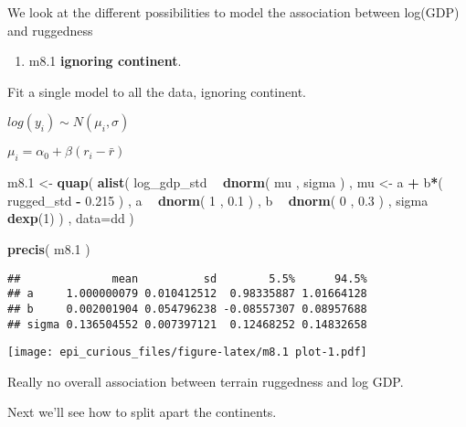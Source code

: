 \documentclass[
]{article}
\newenvironment{Shaded}{\begin{snugshade}}{\end{snugshade}}
\newcommand{\DataTypeTok}[1]{\textcolor[rgb]{0.13,0.29,0.53}{#1}}
\newcommand{\DecValTok}[1]{\textcolor[rgb]{0.00,0.00,0.81}{#1}}
\newcommand{\FloatTok}[1]{\textcolor[rgb]{0.00,0.00,0.81}{#1}}
\newcommand{\KeywordTok}[1]{\textcolor[rgb]{0.13,0.29,0.53}{\textbf{#1}}}
\newcommand{\NormalTok}[1]{#1}
\newcommand{\OperatorTok}[1]{\textcolor[rgb]{0.81,0.36,0.00}{\textbf{#1}}}
\newcommand{\StringTok}[1]{\textcolor[rgb]{0.31,0.60,0.02}{#1}}
\providecommand{\tightlist}{%
  \setlength{\itemsep}{0pt}\setlength{\parskip}{0pt}}
\begin{document}
We look at the different possibilities to model the association between
log(GDP) and ruggedness

\begin{enumerate}
\def\labelenumi{\arabic{enumi}.}
\tightlist
\item
  m8.1 \textbf{ignoring continent}.
\end{enumerate}

Fit a single model to all the data, ignoring continent.

\(log(y_i) \sim N(\mu_i, \sigma)\)

\(\mu_i = \alpha_0 + \beta (r_i - \bar{r})\)

\begin{Shaded}
\begin{Highlighting}[]
\NormalTok{m8}\FloatTok{.1}\NormalTok{ <-}\StringTok{ }\KeywordTok{quap}\NormalTok{(}
    \KeywordTok{alist}\NormalTok{(}
\NormalTok{        log_gdp_std }\OperatorTok{~}\StringTok{ }\KeywordTok{dnorm}\NormalTok{( mu , sigma ) ,}
\NormalTok{        mu <-}\StringTok{ }\NormalTok{a }\OperatorTok{+}\StringTok{ }\NormalTok{b}\OperatorTok{*}\NormalTok{( rugged_std }\OperatorTok{-}\StringTok{ }\FloatTok{0.215}\NormalTok{ ) ,}
\NormalTok{        a }\OperatorTok{~}\StringTok{ }\KeywordTok{dnorm}\NormalTok{( }\DecValTok{1}\NormalTok{ , }\FloatTok{0.1}\NormalTok{ ) ,}
\NormalTok{        b }\OperatorTok{~}\StringTok{ }\KeywordTok{dnorm}\NormalTok{( }\DecValTok{0}\NormalTok{ , }\FloatTok{0.3}\NormalTok{ ) ,}
\NormalTok{        sigma }\OperatorTok{~}\StringTok{ }\KeywordTok{dexp}\NormalTok{(}\DecValTok{1}\NormalTok{)}
\NormalTok{    ) , }\DataTypeTok{data=}\NormalTok{dd )}

 \KeywordTok{precis}\NormalTok{( m8}\FloatTok{.1}\NormalTok{ )}
\end{Highlighting}
\end{Shaded}

\begin{verbatim}
##              mean          sd        5.5%      94.5%
## a     1.000000079 0.010412512  0.98335887 1.01664128
## b     0.002001904 0.054796238 -0.08557307 0.08957688
## sigma 0.136504552 0.007397121  0.12468252 0.14832658
\end{verbatim}

\texttt{[image: epi\_curious\_files/figure-latex/m8.1 plot-1.pdf]}

Really no overall association between terrain ruggedness and log GDP.

Next we'll see how to split apart the continents.
\end{document}
